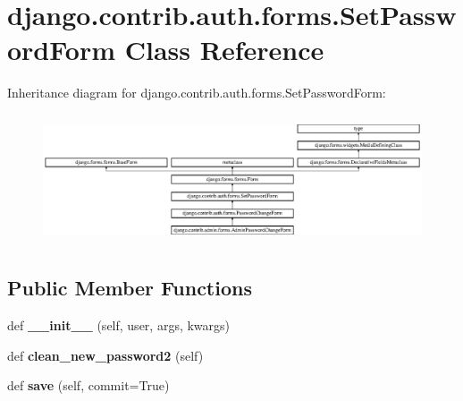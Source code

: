 \hypertarget{classdjango_1_1contrib_1_1auth_1_1forms_1_1_set_password_form}{}\section{django.\+contrib.\+auth.\+forms.\+Set\+Password\+Form Class Reference}
\label{classdjango_1_1contrib_1_1auth_1_1forms_1_1_set_password_form}
Inheritance diagram for django.\+contrib.\+auth.\+forms.\+Set\+Password\+Form\+:\begin{figure}[H]
\begin{center}
\leavevmode
\includegraphics[height=3.843138cm]{classdjango_1_1contrib_1_1auth_1_1forms_1_1_set_password_form}
\end{center}
\end{figure}
\subsection*{Public Member Functions}
\begin{DoxyCompactItemize}
\item 
\mbox{\label{classdjango_1_1contrib_1_1auth_1_1forms_1_1_set_password_form_a7b4355f908fb88aa362a5d5b9d1566ca}} 
def {\bfseries \+\_\+\+\_\+init\+\_\+\+\_\+} (self, user, args, kwargs)
\item 
\mbox{\label{classdjango_1_1contrib_1_1auth_1_1forms_1_1_set_password_form_ab714ee0036caaa35e420d4309683133f}} 
def {\bfseries clean\+\_\+new\+\_\+password2} (self)
\item 
\mbox{\label{classdjango_1_1contrib_1_1auth_1_1forms_1_1_set_password_form_a5db4eadae1bd07d7000210d42915b520}} 
def {\bfseries save} (self, commit=True)
\end{DoxyCompactItemize}
